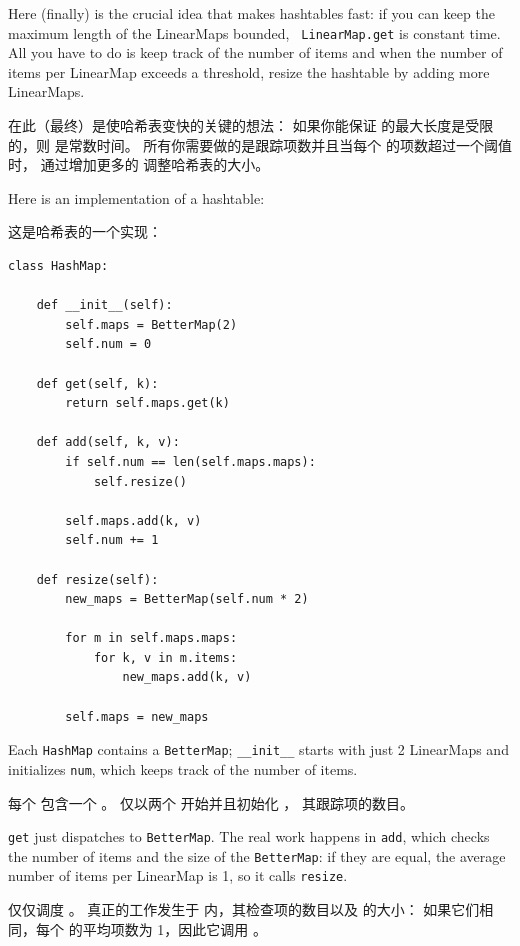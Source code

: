 Here (finally) is the crucial idea that makes hashtables fast: if you
can keep the maximum length of the LinearMaps bounded, {\tt
  LinearMap.get} is constant time.  All you have to do is keep track
of the number of items and when the number of
items per LinearMap exceeds a threshold, resize the hashtable by
adding more LinearMaps.

在此（最终）是使哈希表变快的关键的想法：
如果你能保证  的最大长度是受限的，则  是常数时间。
所有你需要做的是跟踪项数并且当每个  的项数超过一个阈值时，
通过增加更多的  调整哈希表的大小。

Here is an implementation of a hashtable:

这是哈希表的一个实现：

\begin{lstlisting}
class HashMap:

    def __init__(self):
        self.maps = BetterMap(2)
        self.num = 0

    def get(self, k):
        return self.maps.get(k)

    def add(self, k, v):
        if self.num == len(self.maps.maps):
            self.resize()

        self.maps.add(k, v)
        self.num += 1

    def resize(self):
        new_maps = BetterMap(self.num * 2)

        for m in self.maps.maps:
            for k, v in m.items:
                new_maps.add(k, v)

        self.maps = new_maps
\end{lstlisting}

Each {\tt HashMap} contains a {\tt BetterMap}; \verb"__init__" starts
with just 2 LinearMaps and initializes {\tt num}, which keeps track of
the number of items.

每个  包含一个 。
 仅以两个  开始并且初始化 ， 其跟踪项的数目。

{\tt get} just dispatches to {\tt BetterMap}.  The real work happens
in {\tt add}, which checks the number of items and the size of the
{\tt BetterMap}: if they are equal, the average number of items per
LinearMap is 1, so it calls {\tt resize}.

 仅仅调度 。 真正的工作发生于
 内，其检查项的数目以及  的大小：
如果它们相同，每个  的平均项数为 1，因此它调用 。

